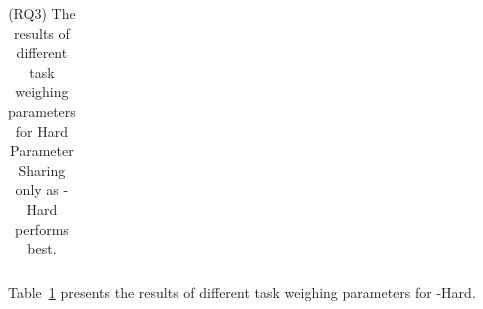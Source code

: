 \begin{table}[t]
\begin{tabular}{l|c|c|c|c}
    \end{tabular}
    \caption{(RQ3) The results of different task weighing parameters for Hard Parameter Sharing only as \our-Hard performs best.}
    \label{tab:rq3 hard-share}
\end{table}


Table~\ref{tab:rq3 hard-share} presents the results of different task weighing parameters for \our-Hard.

